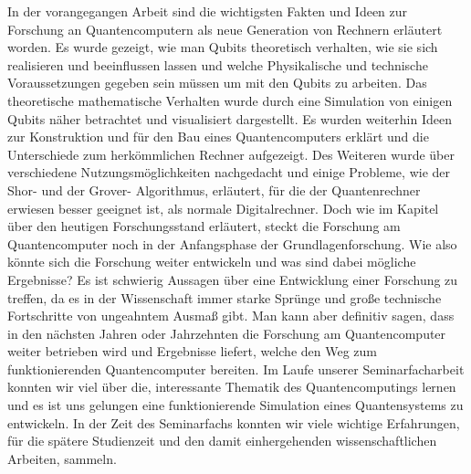 \documentclass[12pt]{report}
\begin{document}
In der vorangegangen Arbeit sind die wichtigsten Fakten und Ideen zur Forschung an Quantencomputern als neue Generation von Rechnern erläutert worden. Es wurde gezeigt, wie man Qubits theoretisch verhalten, wie sie sich realisieren und beeinflussen lassen und welche Physikalische und technische Voraussetzungen gegeben sein müssen um mit den Qubits zu arbeiten. Das theoretische mathematische Verhalten wurde durch eine Simulation von einigen Qubits näher betrachtet und visualisiert dargestellt. Es wurden weiterhin Ideen zur Konstruktion und für den Bau eines Quantencomputers erklärt und die Unterschiede zum herkömmlichen Rechner aufgezeigt. Des Weiteren wurde über verschiedene Nutzungsmöglichkeiten nachgedacht und  einige Probleme, wie der Shor- und der Grover- Algorithmus, erläutert, für die der Quantenrechner erwiesen besser geeignet ist, als normale Digitalrechner.\newline
Doch wie im Kapitel über den heutigen Forschungsstand erläutert, steckt die Forschung am Quantencomputer noch in der Anfangsphase der Grundlagenforschung. Wie also könnte sich die Forschung weiter entwickeln und was sind dabei mögliche Ergebnisse? \newline
Es ist schwierig Aussagen über eine Entwicklung einer Forschung zu treffen, da es in der Wissenschaft immer starke Sprünge und große technische Fortschritte von ungeahntem Ausmaß gibt. Man kann aber definitiv sagen, dass in den nächsten Jahren oder Jahrzehnten die Forschung am Quantencomputer weiter betrieben wird und Ergebnisse liefert, welche den Weg zum funktionierenden Quantencomputer bereiten. \newline \newline
Im Laufe unserer Seminarfacharbeit konnten wir viel über die, interessante Thematik des Quantencomputings lernen und es ist uns gelungen eine funktionierende Simulation eines Quantensystems zu entwickeln. In der Zeit des Seminarfachs konnten wir viele wichtige Erfahrungen, für die spätere Studienzeit und den damit einhergehenden wissenschaftlichen Arbeiten, sammeln.
\end{document}
